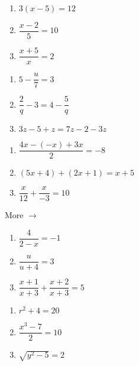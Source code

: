 \documentclass[11pt]{article}
\begin{document}
\begin{multicols}{3}
\begin{enumerate}
\setcounter{enumi}{\theenumCount}
\item $3(x-5) = 12$
\item $\dfrac{x-2}{5} = 10$
\item $\dfrac{x+5}{x} = 2$
\setcounter{enumCount}{\theenumi}
\end{enumerate}
\end{multicols}
\vfill

\begin{multicols}{3}
\begin{enumerate}
\setcounter{enumi}{\theenumCount}
\item $5-\dfrac{u}{7} = 3$
\item $\dfrac{2}{q} -3 =  4- \dfrac{5}{q}$
\item $3z-5 + z = 7 z - 2 - 3z$

\setcounter{enumCount}{\theenumi}
\end{enumerate}
\end{multicols}
\vfill

\begin{multicols}{3}
\begin{enumerate}
\setcounter{enumi}{\theenumCount}
\item $\dfrac{4x-(-x)+3x}{2} = -8$
\item $(5x+4)+(2x+1) = x+5$
\item $\dfrac{x}{12}+\dfrac{x}{-3} = 10$
\setcounter{enumCount}{\theenumi}
\end{enumerate}
\end{multicols}
\vfill



\hfill More $\longrightarrow$

\newpage


\begin{multicols}{3}
\begin{enumerate}
\setcounter{enumi}{\theenumCount}
\item $\dfrac{4}{2-x} = -1$
\item $\dfrac{u}{u+4} = 3$
\item $\dfrac{x+1}{x+3}+\dfrac{x+2}{x+3} = 5$
\setcounter{enumCount}{\theenumi}
\end{enumerate}
\end{multicols}
\vfill


\begin{multicols}{3}
\begin{enumerate}
\setcounter{enumi}{\theenumCount}
\item ${r^2+4} = 20$
\item $\dfrac{x^3 - 7}{2} = 10$
\item $\sqrt{y^2 - 5} = 2$
\setcounter{enumCount}{\theenumi}
\end{enumerate}
\end{multicols}
\vfill
\end{document}
